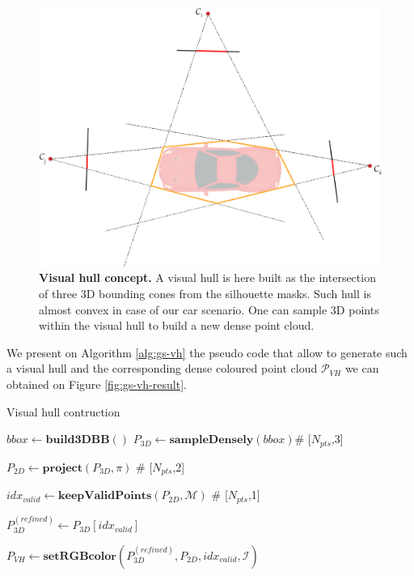 \begin{figure}[htb!]
  \center
\includegraphics[width=.7\linewidth]{images/gaussiansplatting/visualhull-idea.png}
\caption{\textbf{Visual hull concept.} A visual hull is here built as the intersection of three 3D bounding cones from the silhouette masks. Such hull is almost convex in case of our car scenario. One can  sample 3D points within the visual hull to build a new dense point cloud.}
\label{fig:gs-vh-concept}
\end{figure}

We present on Algorithm \ref{alg:gs-vh} the pseudo code that allow to generate such a visual hull and the corresponding dense coloured point cloud $\mathcal{P}_{VH}$ we can obtained on Figure \ref{fig:gs-vh-result}. 

\begin{algorithm}[h]
  \caption{Visual hull contruction}\label{alg:gs-vh}
  \medskip
  \medskip
  $bbox \gets \mathbf{build3DBB}()$ 
  $P_{3D} \gets \mathbf{sampleDensely}(bbox)$\hspace{.4cm}\textcolor{gray!80}{\# 
    [$N_{pts}$,3]} 

   $P_{2D} \gets \mathbf{project}(P_{3D},\pi)$ \hspace{.4cm}\textcolor{gray!80}{\# 
    [$N_{pts}$,2]} 
    
    $idx_{valid} \gets \mathbf{keepValidPoints}(P_{2D},\mathcal{M})$ \hspace{.4cm}\textcolor{gray!80}{\# 
    [$N_{pts}$,1]} 

    $P_{3D}^{(refined)} \gets P_{3D}[idx_{valid}]$ 

    $P_{VH} \gets \mathbf{setRGBcolor}(P_{3D}^{(refined)},P_{2D},idx_{valid},\mathcal{I})$ 
\end{algorithm}


